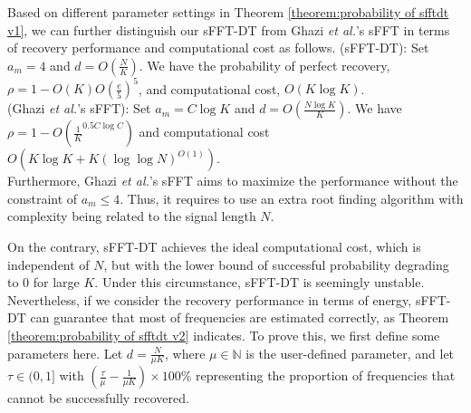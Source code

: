\documentclass[journal,onecolumn,11pt]{IEEEtran}
\begin{document}
Based on different parameter settings in Theorem \ref{theorem:probability of sfftdt v1}, we can further distinguish our sFFT-DT from Ghazi {\em et al.}'s sFFT \cite{Ghazi2013} in terms of recovery performance and computational cost as follows.
(sFFT-DT): Set $a_{m}=4$ and $d=O(\frac{N}{K})$.
We have the probability of perfect recovery, $\rho= 1-O(K)O(\frac{e}{5})^{5}$, and computational cost, $O(K \log K)$.\\
(Ghazi {\em et al.}'s sFFT): Set $a_{m}={C\log K}$ and $d = O(\frac{N\log K}{K})$.
We have $\rho = 1 - O(\frac{1}{K}^{0.5C\log C})$ and computational cost $O(K \log K + K(\log\log N)^{O(1)})$. \\
Furthermore, Ghazi {\em et al.}'s sFFT aims to maximize the performance without the constraint of $a_{m} \leq 4$.
Thus, it requires to use an extra root finding algorithm \cite{Pan2002} with complexity being related to the signal length $N$.

On the contrary, sFFT-DT achieves the ideal computational cost, which is independent of $N$, but with the lower bound of successful probability degrading to $0$ for large $K$.
Under this circumstance, sFFT-DT is seemingly unstable.
Nevertheless, if we consider the recovery performance in terms of energy, sFFT-DT can guarantee that most of frequencies are estimated correctly, as Theorem \ref{theorem:probability of sfftdt v2} indicates.
To prove this, we first define some parameters here.
Let $d=\frac{N}{\mu K}$, where $\mu \in \mathbb{N}$ is the user-defined parameter, and let $\tau \in (0,1]$ with $(\frac{\tau}{\mu}-\frac{1}{\mu K})\times 100\%$ representing the proportion of frequencies that cannot be successfully recovered.
\end{document}
